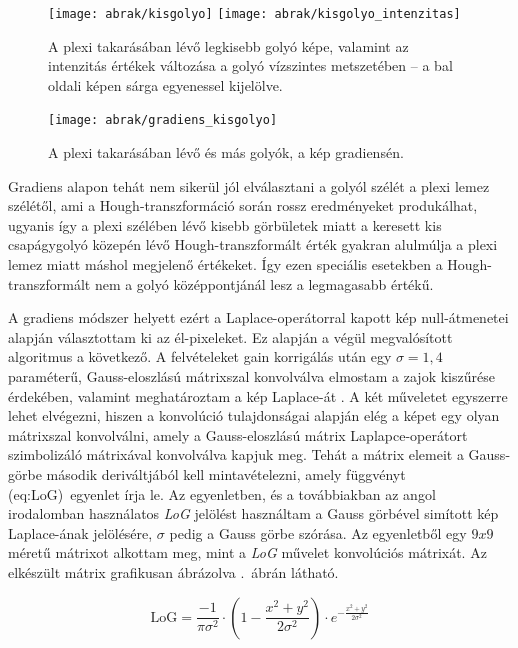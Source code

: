 \documentclass[a4paper,12pt]{article}
\begin{document}
\begin{figure}[htbp]
\center
\texttt{[image: abrak/kisgolyo]}
\texttt{[image: abrak/kisgolyo\_intenzitas]}
\caption{A plexi takarásában lévő legkisebb golyó képe, valamint az intenzitás értékek változása a golyó vízszintes metszetében -- a bal oldali képen sárga egyenessel kijelölve.}
\label{fig:kisgolyo1}
\end{figure}


\begin{figure}[htbp]
\center
\texttt{[image: abrak/gradiens\_kisgolyo]}
\caption{A plexi takarásában lévő és más golyók, a kép gradiensén.}
\label{fig:kisgolyo2}
\end{figure}

Gradiens alapon tehát nem sikerül jól elválasztani a golyól szélét a plexi lemez szélétől, ami a Hough-transzformáció során rossz eredményeket produkálhat, ugyanis így  a plexi szélében lévő kisebb görbületek miatt a keresett kis csapágygolyó közepén lévő Hough-transzformált érték gyakran alulmúlja a plexi lemez miatt máshol megjelenő értékeket. Így ezen speciális esetekben a Hough-transzformált nem a golyó középpontjánál lesz a legmagasabb értékű.


A gradiens módszer helyett ezért a Laplace-operátorral kapott kép null-átmenetei alapján választottam ki az él-pixeleket. Ez alapján a végül megvalósított algoritmus a következő. A felvételeket gain korrigálás után egy $\sigma = 1,\!4$ paraméterű, Gauss-eloszlású mátrixszal konvolválva elmostam a zajok kiszűrése érdekében, valamint meghatároztam a kép Laplace-át . A két műveletet egyszerre lehet elvégezni, hiszen a konvolúció tulajdonságai alapján elég a képet egy olyan mátrixszal konvolválni, amely a Gauss-eloszlású mátrix Laplapce-operátort szimbolizáló mátrixával konvolválva kapjuk meg.  Tehát a mátrix elemeit a Gauss-görbe második deriváltjából kell mintavételezni, amely függvényt \aref({eq:LoG})~egyenlet írja le. Az egyenletben, és a továbbiakban az angol irodalomban használatos \emph{LoG} jelölést használtam a Gauss görbével simított kép Laplace-ának jelölésére, $\sigma$ pedig a Gauss görbe szórása. Az egyenletből egy $9x9$ méretű mátrixot alkottam meg, mint a \emph{LoG} művelet konvolúciós mátrixát. Az elkészült mátrix grafikusan ábrázolva .~ábrán látható.

\begin{equation}
\label{eq:LoG}
\text{LoG} = \frac{-1}{\pi \sigma^2} \cdot \left ( 1-\frac{x^2+y^2}{2\sigma^2} \right ) \cdot e^{-\frac{x^2+y^2}{2\sigma^2}}
\end{equation}
\end{document}
